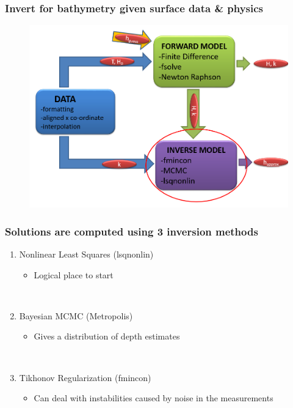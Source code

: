 \documentclass[7pt]{beamer}
\begin{document}
\begin{frame}
 	\frametitle{Invert for bathymetry given surface data \& physics}
		\begin{figure}
			\includegraphics[width=1.0\linewidth]{img/INV.png}
		\end{figure}
\end{frame}

\begin{frame}
	\frametitle{Solutions are computed using 3 inversion methods}
		\centering
		\begin{enumerate}
			\item Nonlinear Least Squares (lsqnonlin)
			\begin{itemize}
				\item Logical place to start
			\end{itemize}
			$\,$\\
			\item Bayesian MCMC (Metropolis)
			\begin{itemize}
				\item Gives a distribution of depth estimates
			\end{itemize}
			$\,$\\
			\item Tikhonov Regularization (fmincon)
			\begin{itemize}
				\item Can deal with instabilities caused by noise in the measurements
			\end{itemize}
		\end{enumerate}
\end{frame}
\end{document}
